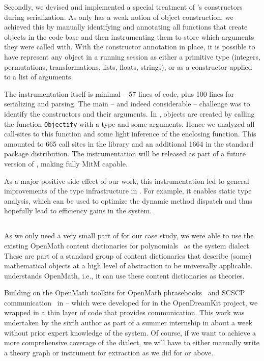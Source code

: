 Secondly, we devised and implemented a special treatment of \GAP's constructors during serialization.
As \GAP only has a weak notion of object construction, we achieved this by manually identifying and annotating all functions that create objects in the \GAP code base and then instrumenting them to store which arguments they were called with.
With the constructor annotation in place, it is possible to have \GAP represent any object in a running session as either a primitive type (integers, permutations, transformations, lists, floats, strings), or as a constructor applied to a list of arguments.

The instrumentation itself is minimal -- 57 lines of \GAP code, plus 100 lines for serializing and parsing.
The main -- and indeed considerable -- challenge was to identify the constructors and their arguments.
In \GAP, objects are created by calling the function \lstinline|Objectify| with a type and some arguments.
Hence we analyzed
all call-sites to this function and some light inference of the enclosing function.
This amounted to 665 call sites in the \GAP library and an additional 1664 in the standard package distribution.
The instrumentation will be released as part of a future version of \GAP, making \GAP fully MitM capable.

As a major positive side-effect of our work, this instrumentation led to general improvements of the type infrastructure in \GAP.
For example, it enables static type analysis, which can be used to optimize the dynamic method dispatch and thus hopefully lead to efficiency gains in the system.

\subsection{\Singular}

As we only need a very small part of \Singular for our case study, we were able to use the existing OpenMath content dictionaries for polynomials~\cite{OMCD:poly:on} as the \Singular system dialect.
These are part of a standard group of content dictionaries that describe (some) mathematical objects at a high level of abstraction to be universally applicable.
\OMMT understands OpenMath, i.e., it can use these content dictionaries as \OMMT theories.

Building on the OpenMath toolkits for OpenMath phrasebooks~\cite{py-openmath:on} and SCSCP communication~\cite{py-scscp:on} in {\Python} -- which were developed for \Sage in the
OpenDreamKit project, we wrapped \Singular in a thin layer of \Python code that provides \SCSCP communication.
This work was undertaken by the sixth author as part of a summer internship in about a week without prior expert knowledge of the system. Of course, if we want to achieve a more comprehensive coverage of the \Singular dialect, we will have to either manually write a theory graph or instrument \Singular for extraction as we did for \Sage or \GAP above. 

